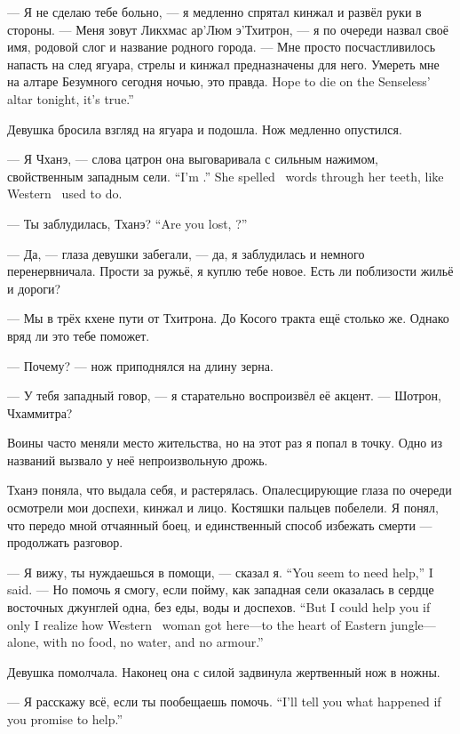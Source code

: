--- Я не сделаю тебе больно, --- я медленно спрятал кинжал и развёл руки в стороны.
--- Меня зовут Ликхмас ар’Люм э’Тхитрон, --- я по очереди назвал своё имя, родовой слог и название родного города.
--- Мне просто посчастливилось напасть на след ягуара, стрелы и кинжал предназначены для него.
{Умереть мне на алтаре Безумного сегодня ночью, это правда.}
{Hope to die on the Senseless' altar tonight, it's true.''}

Девушка бросила взгляд на ягуара и подошла.
Нож медленно опустился.

{--- Я Чханэ, --- слова цатрон она выговаривала с сильным нажимом, свойственным западным сели.}
{``I'm \Chhanei.'' She spelled \Tesatron\ words through her teeth, like Western \Seli\ used to do.}

{--- Ты заблудилась, Тханэ?}
{``Are you lost, \Tchanoe?''}

--- Да, --- глаза девушки забегали, --- да, я заблудилась и немного перенервничала.
Прости за ружьё, я куплю тебе новое.
Есть ли поблизости жильё и дороги?

--- Мы в трёх кхене пути от Тхитрона.
До Косого тракта ещё столько же.
Однако вряд ли это тебе поможет.

--- Почему? --- нож приподнялся на длину зерна.

--- У тебя западный говор, --- я старательно воспроизвёл её акцент.
--- Шотрон, Чхаммитра?

Воины часто меняли место жительства, но на этот раз я попал в точку.
Одно из названий вызвало у неё непроизвольную дрожь.

Тханэ поняла, что выдала себя, и растерялась.
Опалесцирующие глаза по очереди осмотрели мои доспехи, кинжал и лицо.
Костяшки пальцев побелели.
Я понял, что передо мной отчаянный боец, и единственный способ избежать смерти --- продолжать разговор.

{--- Я вижу, ты нуждаешься в помощи, --- сказал я.}
{``You seem to need help,'' I said.}
{--- Но помочь я смогу, если пойму, как западная сели оказалась в сердце восточных джунглей одна, без еды, воды и доспехов.}
{``But I could help you if only I realize how Western \Seli\ woman got here---to the heart of Eastern jungle---alone, with no food, no water, and no armour.''}

Девушка помолчала.
Наконец она с силой задвинула жертвенный нож в ножны.

{--- Я расскажу всё, если ты пообещаешь помочь.}
{``I'll tell you what happened if you promise to help.''}


